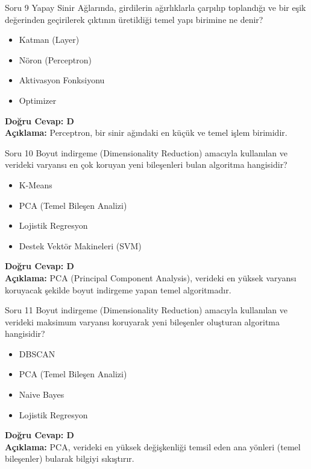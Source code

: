 \documentclass[12pt,a4paper]{article}
\begin{document}
\begin{testcard}{Soru 9}
    Yapay Sinir Ağlarında, girdilerin ağırlıklarla çarpılıp toplandığı ve bir eşik değerinden geçirilerek çıktının üretildiği temel yapı birimine ne denir?
    \begin{itemize}
        \item[A)] Katman (Layer)
        \item[B)] Nöron (Perceptron)
        \item[C)] Aktivasyon Fonksiyonu
        \item[D)] Optimizer
    \end{itemize}
    \tcblower
    \textbf{Doğru Cevap: D} \\
    \textbf{Açıklama:} Perceptron, bir sinir ağındaki en küçük ve temel işlem birimidir.
\end{testcard}

\begin{testcard}{Soru 10}
    Boyut indirgeme (Dimensionality Reduction) amacıyla kullanılan ve verideki varyansı en çok koruyan yeni bileşenleri bulan algoritma hangisidir?
    \begin{itemize}
        \item[A)] K-Means
        \item[B)] PCA (Temel Bileşen Analizi)
        \item[C)] Lojistik Regresyon
        \item[D)] Destek Vektör Makineleri (SVM)
    \end{itemize}
    \tcblower
    \textbf{Doğru Cevap: D} \\
    \textbf{Açıklama:} PCA (Principal Component Analysis), verideki en yüksek varyansı koruyacak şekilde boyut indirgeme yapan temel algoritmadır.
\end{testcard}

\begin{testcard}{Soru 11}
    Boyut indirgeme (Dimensionality Reduction) amacıyla kullanılan ve verideki maksimum varyansı koruyarak yeni bileşenler oluşturan algoritma hangisidir?
    \begin{itemize}
        \item[A)] DBSCAN
        \item[B)] PCA (Temel Bileşen Analizi)
        \item[C)] Naive Bayes
        \item[D)] Lojistik Regresyon
    \end{itemize}
    \tcblower
    \textbf{Doğru Cevap: D} \\
    \textbf{Açıklama:} PCA, verideki en yüksek değişkenliği temsil eden ana yönleri (temel bileşenler) bularak bilgiyi sıkıştırır.
\end{testcard}
\end{document}

